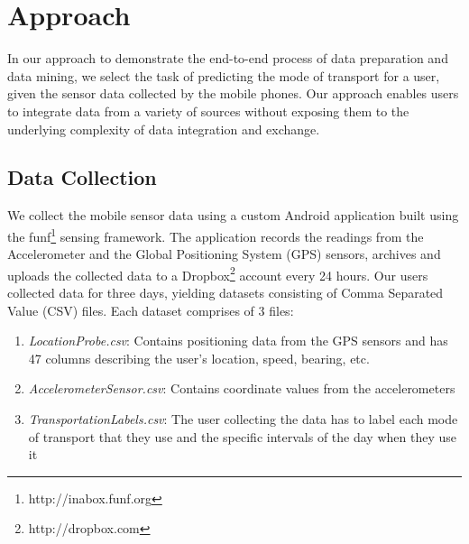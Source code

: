 \section{Approach}

In our approach to demonstrate the end-to-end process of data preparation and data mining, we select the task of predicting the mode of transport for a user, given the sensor data collected by the mobile phones. Our approach enables users to integrate data from a variety of sources without exposing them to the underlying complexity of data integration and exchange.
 

\subsection{Data Collection}
We collect the mobile sensor data using a custom Android application built using the funf\footnote{http://inabox.funf.org} sensing framework. The application records the readings from the Accelerometer and the Global Positioning System (GPS) sensors, archives and uploads the collected data to a Dropbox\footnote{http://dropbox.com} account every 24 hours. Our users collected data for three days, yielding datasets consisting of Comma Separated Value (CSV) files. Each dataset comprises of 3 files:

\begin{enumerate}
  \item \textit{LocationProbe.csv}: Contains positioning data from the GPS sensors and has 47 columns describing the user's location, speed, bearing, etc.
  \item \textit{AccelerometerSensor.csv}: Contains coordinate values from the accelerometers
  \item \textit{TransportationLabels.csv}: The user collecting the data has to label each mode of transport that they use and the specific intervals of the day when they use it
\end{enumerate} 

